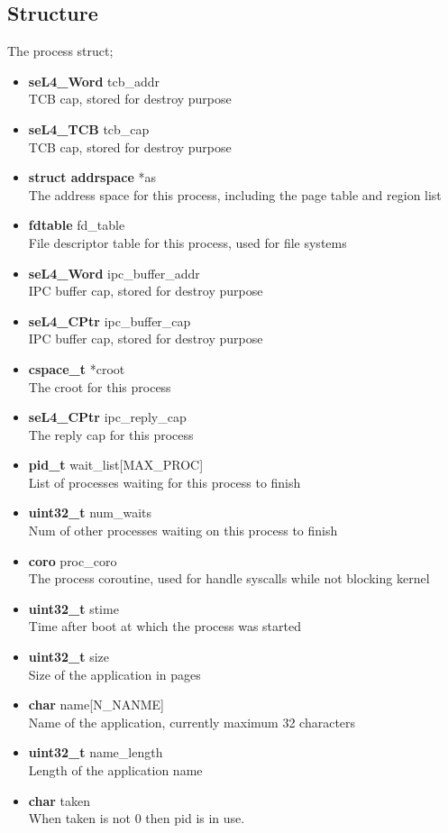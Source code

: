 \documentclass[12pt]{article}
\begin{document}
\subsection{Structure}
The process struct;
\begin{itemize}
\item \textbf{seL4\_Word} tcb\_addr\\
TCB cap, stored for destroy purpose
\item \textbf{seL4\_TCB} tcb\_cap\\
TCB cap, stored for destroy purpose
\item \textbf{struct addrspace} *as\\
The address space for this process, including the page table and region list
\item \textbf{fdtable} fd\_table\\
File descriptor table for this process, used for file systems
\item \textbf{seL4\_Word} ipc\_buffer\_addr\\
IPC buffer cap, stored for destroy purpose
\item \textbf{seL4\_CPtr} ipc\_buffer\_cap\\
IPC buffer cap, stored for destroy purpose
\item \textbf{cspace\_t} *croot\\
The croot for this process
\item \textbf{seL4\_CPtr} ipc\_reply\_cap\\
The reply cap for this process
\item \textbf{pid\_t} wait\_list[MAX\_PROC]\\
List of processes waiting for this process to finish
\item \textbf{uint32\_t} num\_waits\\
Num of other processes waiting on this process to finish
\item \textbf{coro} proc\_coro\\
The process coroutine, used for handle syscalls while not blocking kernel
\item \textbf{uint32\_t} stime\\
Time after boot at which the process was started
\item \textbf{uint32\_t} size\\
Size of the application in pages
\item \textbf{char} name[N\_NANME]\\
Name of the application, currently maximum 32 characters
\item \textbf{uint32\_t} name\_length\\
Length of the application name
\item \textbf{char} taken\\
When taken is not 0 then pid is in use.
\end{itemize}
\end{document}
